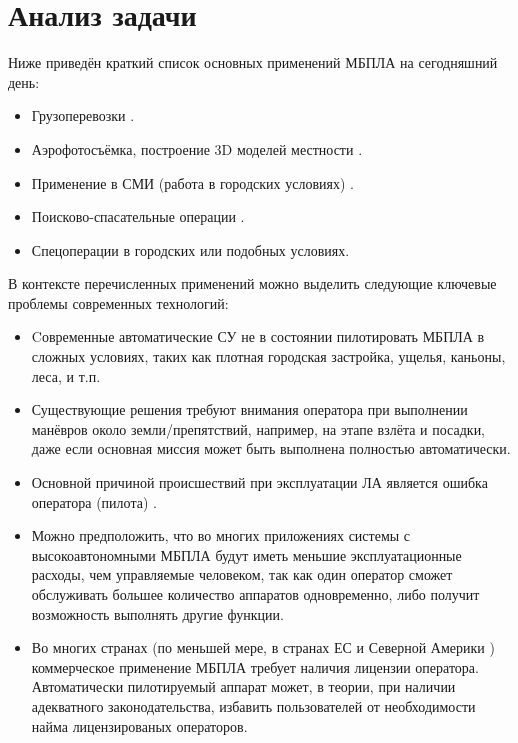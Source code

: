 \documentclass[11pt,a4paper]{article}
\begin{document}
\section{Анализ задачи}

Ниже приведён краткий список основных применений МБПЛА на сегодняшний день:

\begin{itemize}
    \item Грузоперевозки \cite{AmazonPrimeAir, DHLParcelcopter}.
    \item Аэрофотосъёмка, построение 3D моделей местности \cite{DroneMapper, MicrodronesAerialImagery}.
    \item Применение в СМИ (работа в городских условиях) \cite{DroneJournalism}.
    \item Поисково-спасательные операции \cite{SARDrones}.
    \item Спецоперации в городских или подобных условиях.
\end{itemize}

В контексте перечисленных применений можно выделить следующие ключевые проблемы современных технологий:

\begin{itemize}
    \item Cовременные автоматические СУ не в состоянии пилотировать МБПЛА в сложных условиях, таких как плотная городская застройка, ущелья, каньоны, леса, и т.п.
    \item Существующие решения требуют внимания оператора при выполнении манёвров около земли/препятствий, например, на этапе взлёта и посадки, даже если основная миссия может быть выполнена полностью автоматически.
    \item Основной причиной происшествий при эксплуатации ЛА является ошибка оператора (пилота) \cite{RiskManagementHandbookFAA, PlaneCrashInfo, HumanFactorsBoeing}.
    \item Можно предположить, что во многих приложениях системы с высокоавтономными МБПЛА будут иметь меньшие эксплуатационные расходы, чем управляемые человеком, так как один оператор сможет обслуживать большее количество аппаратов одновременно, либо получит возможность выполнять другие функции.
    \item Во многих странах (по меньшей мере, в странах ЕС \cite{EURPASFAQ} и Северной Америки \cite{FAAUAS}) коммерческое применение МБПЛА требует наличия лицензии оператора. Автоматически пилотируемый аппарат может, в теории, при наличии адекватного законодательства, избавить пользователей от необходимости найма лицензированых операторов.
\end{itemize}
\end{document}
